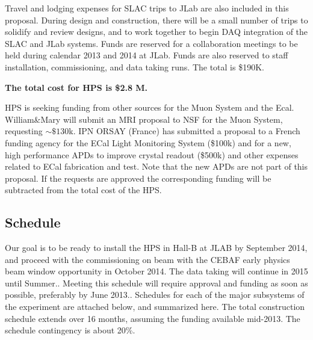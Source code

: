 Travel and lodging expenses for SLAC trips to JLab are also included in this proposal. During design and construction, there will be a small number of trips to solidify and review designs, and to work together to begin DAQ integration of the SLAC and JLab systems. Funds are reserved for a collaboration meetings to be held during calendar 2013 and 2014 at JLab. Funds are also reserved  to staff installation, commissioning, and data taking runs. The total is \$190K.

{\bf The total cost for HPS is \$2.8 M. }

HPS is seeking funding from other sources for the Muon System and the Ecal.
William\&Mary will submit an MRI proposal to NSF for the Muon System, requesting $\sim \$130$k. IPN ORSAY (France) has submitted a proposal to a French funding agency for the ECal Light Monitoring System (\$100k) and for a new, high performance APDs to improve crystal readout (\$500k) and other expenses related to ECal fabrication and test. Note that the new APDs are not part of this proposal. If the requests are approved the corresponding funding will be subtracted from the total cost of the HPS. 

\subsection{Schedule}

Our goal is to be ready to install the HPS in Hall-B at JLAB  by September 2014, and proceed with the commissioning on beam with the CEBAF early physics beam window opportunity in October 2014. The data taking will continue in 2015 until Summer.. Meeting this schedule  will require approval and funding as soon as possible, preferably by June 2013.. Schedules for each of the major subsystems of the experiment are attached below, and summarized here. The total construction schedule extends over  16 months, assuming the funding available mid-2013. The schedule contingency is about 20\%. 

